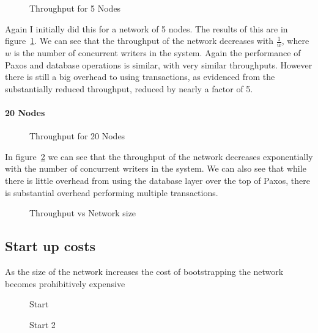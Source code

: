 \documentclass[12pt,twoside,notitlepage]{report}
\newcommand{\lwincludegraphics}[2][]{%
  \sbox{0}{\texttt{[image: \#2]}}%
  \ifdim\wd0>\linewidth
    \resizebox{\linewidth}{!}{\box0 }%
  \else
    \leavevmode\box0
  \fi}
\begin{document}
\begin{figure}[htb]
\centering
\lwincludegraphics[scale=2]{figs/thru_5.eps}
\caption{\label{fig:thruput-5}Throughput for 5 Nodes}
\end{figure}

Again I initially did this for a network of 5 nodes. The results of this are in
figure~\ref{fig:thruput-5}. We can see that the throughput of the network decreases with
$\frac{1}{w}$, where $w$ is the number of concurrent writers in the system. Again the performance of
Paxos and database operations is similar, with very similar throughputs. However there is still a
big overhead to using transactions, as evidenced from the substantially reduced throughput,
reduced by nearly a factor of 5.

\paragraph{20 Nodes}

\begin{figure}[htb]
\centering
\lwincludegraphics[scale=2]{figs/thru_20.eps}
\caption{\label{fig:thruput-20}Throughput for 20 Nodes}
\end{figure}

In figure~\ref{fig:thruput-20} we can see that the throughput of the network decreases
exponentially with the number of concurrent writers in the system. We can also see that while
there is little overhead from using the database layer over the top of Paxos, there is substantial
overhead performing multiple transactions.

\begin{figure}[htb]
\centering
\lwincludegraphics[scale=2]{figs/thru_rev.eps}
\caption{\label{fig:thruput-rev}Throughput vs Network size}
\end{figure}

\subsection{Start up costs}

As the size of the network increases the cost of bootstrapping the network becomes prohibitively
expensive

\begin{figure}[htb]
\centering
\lwincludegraphics[scale=2]{figs/start.eps}
\caption{\label{fig:start}Start}
\end{figure}


\begin{figure}[htb]
\centering
\lwincludegraphics[scale=2]{figs/start2.eps}
\caption{\label{fig:start2}Start 2}
\end{figure}
\end{document}
